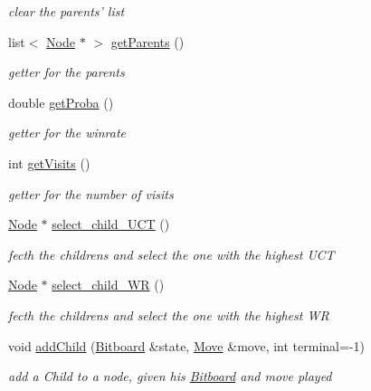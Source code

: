 \begin{DoxyCompactItemize}
\begin{DoxyCompactList}\small\item\em clear the parents' list \end{DoxyCompactList}\item 
list$<$ \hyperlink{classmcts_1_1_node}{Node} $\ast$ $>$ \hyperlink{classmcts_1_1_node_aa1670c2fae272a00356b88b6a8d382b9}{get\+Parents} ()
\begin{DoxyCompactList}\small\item\em getter for the parents \end{DoxyCompactList}\item 
double \hyperlink{classmcts_1_1_node_a15b5ee0530be2b48df18658f5caa0273}{get\+Proba} ()
\begin{DoxyCompactList}\small\item\em getter for the winrate \end{DoxyCompactList}\item 
int \hyperlink{classmcts_1_1_node_af93b8855df1ad7521b1b8a11ea21c410}{get\+Visits} ()
\begin{DoxyCompactList}\small\item\em getter for the number of visits \end{DoxyCompactList}\item 
\hyperlink{classmcts_1_1_node}{Node} $\ast$ \hyperlink{classmcts_1_1_node_a077c08375da809ea3e7169e827c93009}{select\+\_\+child\+\_\+\+U\+C\+T} ()
\begin{DoxyCompactList}\small\item\em fecth the childrens and select the one with the highest U\+C\+T \end{DoxyCompactList}\item 
\hyperlink{classmcts_1_1_node}{Node} $\ast$ \hyperlink{classmcts_1_1_node_aecba4d455461ba7966d50729fb920ebf}{select\+\_\+child\+\_\+\+W\+R} ()
\begin{DoxyCompactList}\small\item\em fecth the childrens and select the one with the highest W\+R \end{DoxyCompactList}\item 
void \hyperlink{classmcts_1_1_node_abfd6046ffb96472a9058ee88f05fdc61}{add\+Child} (\hyperlink{class_bitboard}{Bitboard} \&state, \hyperlink{class_move}{Move} \&move, int terminal=-\/1)
\begin{DoxyCompactList}\small\item\em add a Child to a node, given his \hyperlink{class_bitboard}{Bitboard} and move played \end{DoxyCompactList}\item 

\end{DoxyCompactItemize}
